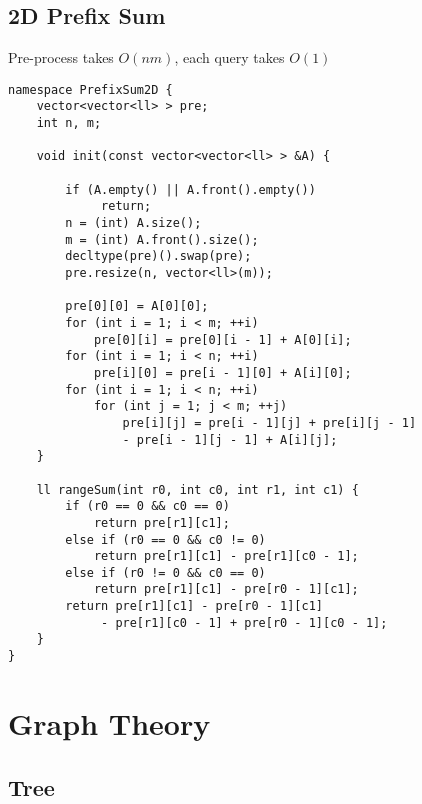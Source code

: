 \documentclass[10pt]{article}{\twocolumn}
\begin{document}
\subsection{2D Prefix Sum}
Pre-process takes $O(nm)$, each query takes $O(1)$
\begin{lstlisting}
namespace PrefixSum2D {
    vector<vector<ll> > pre;
    int n, m;

    void init(const vector<vector<ll> > &A) {

        if (A.empty() || A.front().empty()) 
             return;
        n = (int) A.size();
        m = (int) A.front().size();
        decltype(pre)().swap(pre);
        pre.resize(n, vector<ll>(m));

        pre[0][0] = A[0][0];
        for (int i = 1; i < m; ++i)
            pre[0][i] = pre[0][i - 1] + A[0][i];
        for (int i = 1; i < n; ++i)
            pre[i][0] = pre[i - 1][0] + A[i][0];
        for (int i = 1; i < n; ++i)
            for (int j = 1; j < m; ++j)
                pre[i][j] = pre[i - 1][j] + pre[i][j - 1] 
                - pre[i - 1][j - 1] + A[i][j];
    }

    ll rangeSum(int r0, int c0, int r1, int c1) {
        if (r0 == 0 && c0 == 0) 
            return pre[r1][c1];
        else if (r0 == 0 && c0 != 0) 
            return pre[r1][c1] - pre[r1][c0 - 1];
        else if (r0 != 0 && c0 == 0) 
            return pre[r1][c1] - pre[r0 - 1][c1];
        return pre[r1][c1] - pre[r0 - 1][c1] 
             - pre[r1][c0 - 1] + pre[r0 - 1][c0 - 1];
    }
}
\end{lstlisting}


\section{Graph Theory}

\subsection{Tree}
\end{document}
